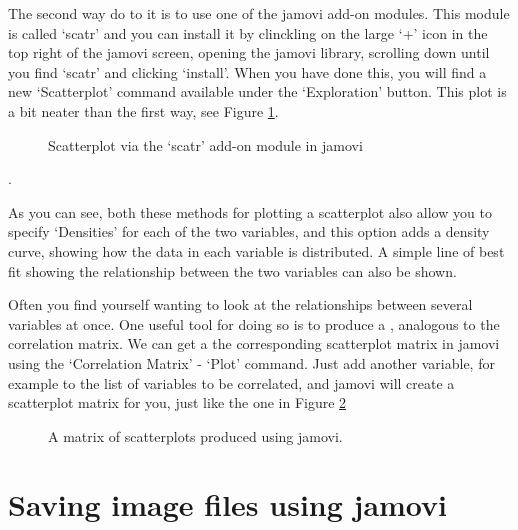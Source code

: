 The second way do to it is to use one of the jamovi add-on modules. This module is called `scatr' and you can install it by clinckling on the large `+' icon in the top right of the jamovi screen, opening the jamovi library, scrolling down until you find `scatr' and clicking `install'. When you have done this, you will find a new `Scatterplot' command available under the `Exploration' button. This plot is a bit neater than the first way, see Figure \ref{fig:scatterplot2}.

\begin{figure}[ht]
\begin{center}
\caption{Scatterplot via the `scatr' add-on module in jamovi}
\label{fig:scatterplot2}
\HR
\end{center}
\end{figure}. 

As you can see, both these methods for plotting a scatterplot also allow you to specify `Densities' for each of the two variables, and this option adds a density curve, showing how the data in each variable is distributed. A simple line of best fit showing the relationship between the two variables can also be shown. 


Often you find yourself wanting to look at the relationships between several variables at once. One useful tool for doing so is to produce a , analogous to the correlation matrix. We can get a the corresponding scatterplot matrix in jamovi using the `Correlation Matrix' - `Plot' command. Just add another variable, for example  to the list of variables to be correlated, and jamovi will create a scatterplot matrix for you, just like the one in Figure \ref{fig:scatterplot3}


\begin{figure}[ht]
\begin{center}
\caption{A matrix of scatterplots produced using jamovi.}
\HR
\label{fig:scatterplot3}
\end{center}
\end{figure}


\section{Saving image files using jamovi~\label{sec:saveimage}}

